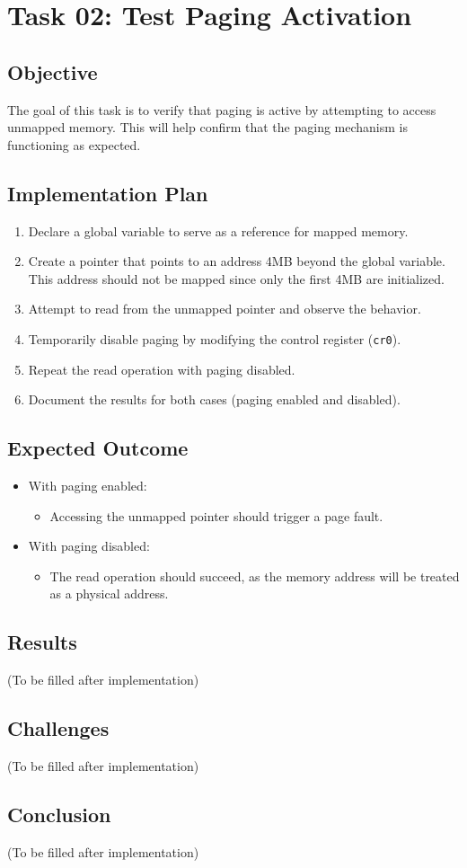 \documentclass[a4paper,12pt]{report}
\begin{document}
\chapter{Task 02: Test Paging Activation}

\section{Objective}
The goal of this task is to verify that paging is active by attempting to access unmapped memory. This will help confirm that the paging mechanism is functioning as expected.

\section{Implementation Plan}
\begin{enumerate}
    \item Declare a global variable to serve as a reference for mapped memory.
    \item Create a pointer that points to an address 4MB beyond the global variable. This address should not be mapped since only the first 4MB are initialized.
    \item Attempt to read from the unmapped pointer and observe the behavior.
    \item Temporarily disable paging by modifying the control register (\texttt{cr0}).
    \item Repeat the read operation with paging disabled.
    \item Document the results for both cases (paging enabled and disabled).
\end{enumerate}

\section{Expected Outcome}
\begin{itemize}
    \item With paging enabled:
    \begin{itemize}
        \item Accessing the unmapped pointer should trigger a page fault.
    \end{itemize}
    \item With paging disabled:
    \begin{itemize}
        \item The read operation should succeed, as the memory address will be treated as a physical address.
    \end{itemize}
\end{itemize}

\section{Results}
(To be filled after implementation)

\section{Challenges}
(To be filled after implementation)

\section{Conclusion}
(To be filled after implementation)
\end{document}
